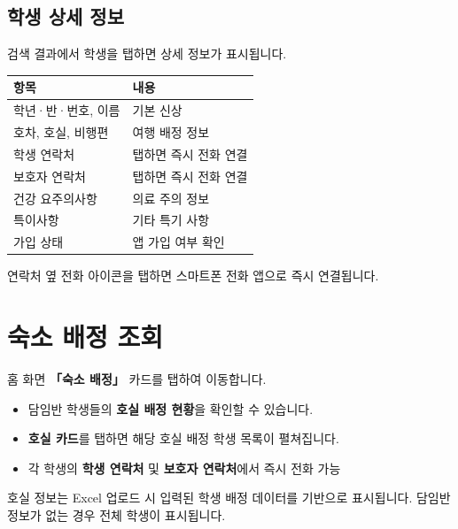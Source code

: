 \documentclass[a4paper,11pt]{article}
\begin{document}
\subsection{학생 상세 정보}

검색 결과에서 학생을 탭하면 상세 정보가 표시됩니다.

\begin{center}
\begin{tabular}{@{}ll@{}}
  \toprule
  \textbf{항목} & \textbf{내용} \\
  \midrule
  학년·반·번호, 이름 & 기본 신상 \\
  호차, 호실, 비행편 & 여행 배정 정보 \\
  학생 연락처 & 탭하면 즉시 전화 연결 \\
  보호자 연락처 & 탭하면 즉시 전화 연결 \\
  건강 요주의사항 & 의료 주의 정보 \\
  특이사항 & 기타 특기 사항 \\
  가입 상태 & 앱 가입 여부 확인 \\
  \bottomrule
\end{tabular}
\end{center}

\begin{tcolorbox}[tipbox]
연락처 옆 전화 아이콘을 탭하면 스마트폰 전화 앱으로 즉시 연결됩니다.
\end{tcolorbox}

\section{숙소 배정 조회}

홈 화면 \textbf{「숙소 배정」} 카드를 탭하여 이동합니다.

\begin{itemize}
  \item 담임반 학생들의 \textbf{호실 배정 현황}을 확인할 수 있습니다.
  \item \textbf{호실 카드}를 탭하면 해당 호실 배정 학생 목록이 펼쳐집니다.
  \item 각 학생의 \textbf{학생 연락처} 및 \textbf{보호자 연락처}에서 즉시 전화 가능
\end{itemize}

\begin{tcolorbox}[infobox]
호실 정보는 Excel 업로드 시 입력된 학생 배정 데이터를 기반으로 표시됩니다.
담임반 정보가 없는 경우 전체 학생이 표시됩니다.
\end{tcolorbox}
\end{document}
